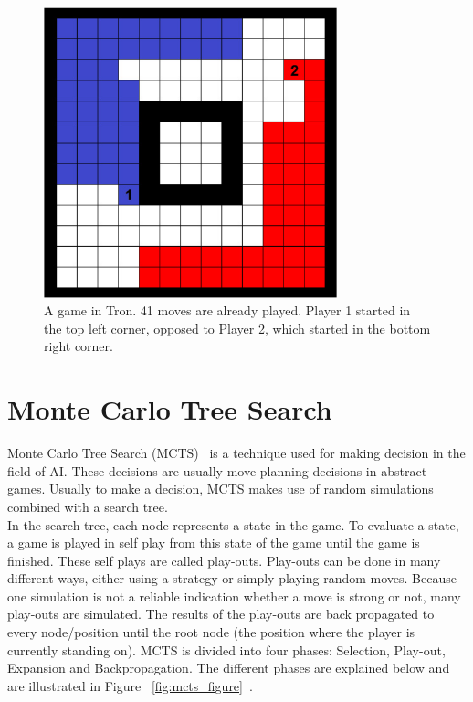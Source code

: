 \documentclass{article}
\begin{document}
\begin{figure}
\begin{center}
\includegraphics[width=8.5cm]{images/tron_field.png}
\caption{A game in Tron. 41 moves are already played. Player 1 started in the top left corner, opposed to Player 2, which started in the bottom right corner.\label{fig:tron_board}}
\end{center}
\end{figure}

\section{Monte Carlo Tree Search}
\label{sec:mcts}
Monte Carlo Tree Search (MCTS)~\cite{coulom, kocsis} is a technique used for making decision in the field of AI. These decisions are usually move planning decisions in abstract games. Usually to make a decision, MCTS makes use of random simulations combined with a search tree.\\
In the search tree, each node represents a state in the game. To evaluate a state, a game is played in self play from this state of the game until the game is finished. These self plays are called play-outs. Play-outs can be done in many different ways, either using a strategy or simply playing random moves. Because one simulation is not a reliable indication whether a move is strong or not, many play-outs are simulated. The results of the play-outs are back propagated to every node/position until the root node (the position where the player is currently standing on).
MCTS is divided into four phases: Selection, Play-out, Expansion and Backpropagation. The different phases are explained below and are illustrated in Figure ~\ref{fig:mcts_figure}~\cite{ChaslotWHUB2008}.
\end{document}
